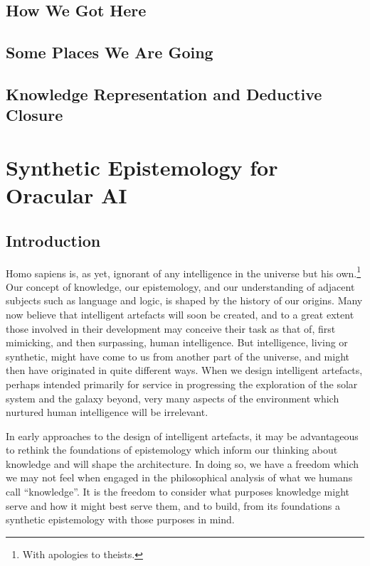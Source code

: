 \documentclass[10pt,titlepage]{book}
\begin{document}
\section{How We Got Here}

\section{Some Places We Are Going}

\section{Knowledge Representation and Deductive Closure}


\chapter{Synthetic Epistemology for Oracular AI}


\section{Introduction}

Homo sapiens is, as yet, ignorant of any intelligence in the universe but his own.\footnote{With apologies to theists.}
Our concept of knowledge, our epistemology, and our understanding of adjacent subjects such as language and logic, is shaped by the history of our origins.
Many now believe that intelligent artefacts will soon be created, and to a great extent those involved in their development may conceive their task as that of, first mimicking, and then surpassing, human intelligence.
But intelligence, living or synthetic, might have come to us from another part of the universe, and might then have originated in quite different ways.
When we design intelligent artefacts, perhaps intended primarily for service in progressing the exploration of the solar system and the galaxy beyond, very many aspects of the environment which nurtured human intelligence will be irrelevant.

In early approaches to the design of intelligent artefacts, it may be advantageous to rethink the foundations of epistemology which inform our thinking about knowledge and will shape the architecture.
In doing so, we have a freedom which we may not feel when engaged in the philosophical analysis of what we humans call ``knowledge''.
It is the freedom to consider what purposes knowledge might serve and how it might best serve them, and to build, from its foundations a synthetic epistemology with those purposes in mind.
\end{document}
